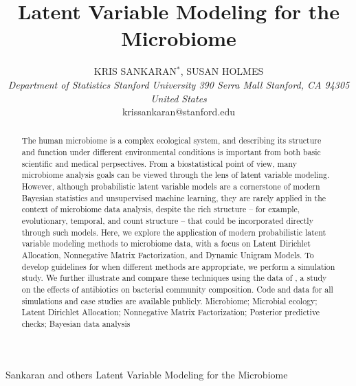 \documentclass[oupdraft]{bio}
\begin{document}
\title{Latent Variable Modeling for the Microbiome}

\author{
  KRIS SANKARAN$^\ast$, SUSAN HOLMES\\[4pt]
  \textit{
    Department of Statistics
    Stanford University
    390 Serra Mall
    Stanford, CA 94305
    United States
  } \\[2pt]
  {krissankaran@stanford.edu}
}

\markboth
{Sankaran and others}
{Latent Variable Modeling for the Microbiome}

\maketitle


\begin{abstract}
  {
    The human microbiome is a complex ecological system, and describing its
    structure and function under different environmental conditions is important
    from both basic scientific and medical perpsectives. From a biostatistical
    point of view, many microbiome analysis goals can be viewed through the lens
    of latent variable modeling. However, although probabilistic latent variable
    models are a cornerstone of modern Bayesian statistics and unsupervised
    machine learning, they are rarely applied in the context of microbiome data
    analysis, despite the rich structure -- for example, evolutionary, temporal,
    and count structure -- that could be incorporated directly through such
    models. Here, we explore the application of modern probabilistic latent
    variable modeling methods to microbiome data, with a focus on Latent
    Dirichlet Allocation, Nonnegative Matrix Factorization, and Dynamic Unigram
    Models. To develop guidelines for when different methods are appropriate, we
    perform a simulation study. We further illustrate and compare these
    techniques using the data of \citep{dethlefsen2011incomplete}, a study on
    the effects of antibiotics on bacterial community composition. Code and data
    for all simulations and case studies are available publicly.
  }
  {
    Microbiome; Microbial ecology; Latent Dirichlet Allocation; Nonnegative
    Matrix Factorization; Posterior predictive checks; Bayesian data analysis
  }
\end{abstract}
\end{document}
